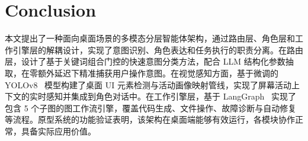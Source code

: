 \section{Conclusion}

本文提出了一种面向桌面场景的多模态分层智能体架构，通过路由层、角色层和工作引擎层的解耦设计，实现了意图识别、角色表达和任务执行的职责分离。在路由层，设计了基于关键词组合门控的快速意图分类方法，配合 LLM 结构化参数抽取，在零额外延迟下精准捕获用户操作意图。在视觉感知方面，基于微调的 YOLOv8~\cite{jocher2023yolov8} 模型构建了桌面 UI 元素检测与活动画像映射管线，实现了屏幕活动上下文的实时感知并集成到角色对话中。在工作引擎层，基于 LangGraph~\cite{langchain2024langgraph} 实现了包含 5 个子图的图工作流引擎，覆盖代码生成、文件操作、故障诊断与自动修复等流程。原型系统的功能验证表明，该架构在桌面端能够有效运行，各模块协作正常，具备实际应用价值。
